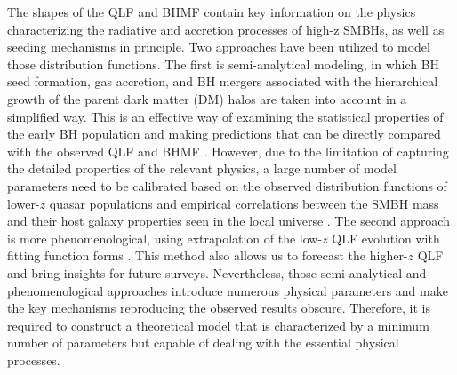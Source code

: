 \documentclass[twocolumn, twocolappendix]{aastex63}
\begin{document}
\begin{CJK*}{UTF8}{gbsn}
The shapes of the QLF and BHMF contain key information on the physics characterizing the radiative 
and accretion processes of high-z SMBHs, as well as seeding mechanisms in principle.
Two approaches have been utilized to model those distribution functions.  
The first is semi-analytical modeling, in which BH seed formation, gas accretion, and BH mergers associated 
with the hierarchical growth of the parent dark matter (DM) halos are taken into account in a simplified way. 
This is an effective way of examining the statistical properties of the early BH population and making predictions 
that can be directly compared with the observed QLF and BHMF
\citep[e.g.,][]{1998ApJ...503..505H,2010ApJ...718..231S,2018MNRAS.474.1995R,2018MNRAS.481.3278R,
2021MNRAS.508.2706Y,2021ApJ...910L..11K,2022MNRAS.511..616T}. 
However, due to the limitation of capturing the detailed properties of the relevant physics, 
a large number of model parameters need to be calibrated based on the observed distribution functions 
of lower-$z$ quasar populations \citep[e.g.,][]{2007ApJ...669...45H}
and empirical correlations between the SMBH mass and their host galaxy properties seen
in the local universe \citep{2013ARA&A..51..511K}.
The second approach is more phenomenological, using extrapolation of the low-$z$ QLF evolution with 
fitting function forms \citep[e.g.,][]{2019MNRAS.488.1035K,2020MNRAS.495.3252S,2022arXiv220702233F}.
This method also allows us to forecast the higher-$z$ QLF and bring insights for future surveys.
Nevertheless, those semi-analytical and phenomenological approaches introduce numerous physical parameters
and make the key mechanisms reproducing the observed results obscure.
Therefore, it is required to construct a theoretical model that is characterized by a minimum number of parameters
but capable of dealing with the essential physical processes.



\end{CJK*}
\end{document}
